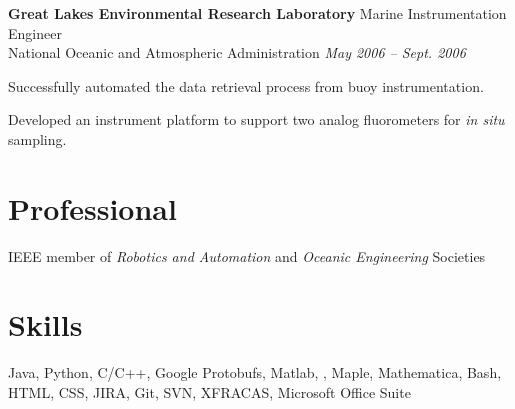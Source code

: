 \documentclass[margin, line]{resume}
\begin{document}
\begin{resume}
    \textbf{Great Lakes Environmental Research Laboratory } \hfill Marine Instrumentation Engineer  \\ 
	National Oceanic and Atmospheric Administration \hfill \textsl{May 2006 -- Sept. 2006} \\
    \vspace{ -2 mm}	
    \begin{list2}
	\item Successfully automated the data retrieval process from buoy instrumentation.
	\item Developed an instrument platform to support two analog fluorometers for \textit{in situ} sampling.
    \end{list2}\vspace{-2mm}

    \section{\mysidestyle Professional} 

    IEEE member of \textsl{Robotics and Automation} and \textsl{Oceanic Engineering} Societies  
	    
	\vspace{-4mm}
    \section{\mysidestyle Skills} 

    Java, Python, C/C++, Google Protobufs, Matlab, \LaTeXe, Maple, Mathematica, Bash, HTML, CSS, JIRA, Git, SVN, XFRACAS, Microsoft Office Suite

\end{resume}
\end{document}
